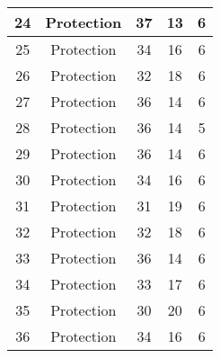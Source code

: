 \documentclass[results.tex]{subfiles}
\begin{document}
\begin{center}
\begin{tabular}{| c || c | c | c | c |}
            \hline
            24                      & Protection                   & 37                     & 13                      & 6                    \\
            \hline
            25                      & Protection                   & 34                     & 16                      & 6                    \\
            \hline
            26                      & Protection                   & 32                     & 18                      & 6                    \\
            \hline
            27                      & Protection                   & 36                     & 14                      & 6                    \\
            \hline
            28                      & Protection                   & 36                     & 14                      & 5                    \\
            \hline
            29                      & Protection                   & 36                     & 14                      & 6                    \\
            \hline
            30                      & Protection                   & 34                     & 16                      & 6                    \\
            \hline
            31                      & Protection                   & 31                     & 19                      & 6                    \\
            \hline
            32                      & Protection                   & 32                     & 18                      & 6                    \\
            \hline
            33                      & Protection                   & 36                     & 14                      & 6                    \\
            \hline
            34                      & Protection                   & 33                     & 17                      & 6                    \\
            \hline
            35                      & Protection                   & 30                     & 20                      & 6                    \\
            \hline
            36                      & Protection                   & 34                     & 16                      & 6                    \\

\end{tabular}
\end{center}
\end{document}
